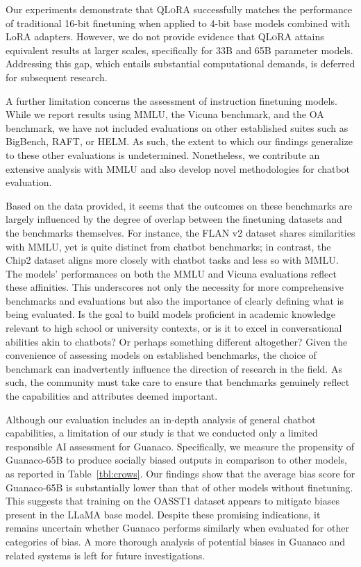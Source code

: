 Our experiments demonstrate that \textsc{QLoRA} successfully matches the performance of traditional 16-bit finetuning when applied to 4-bit base models combined with LoRA adapters. However, we do not provide evidence that \textsc{QLoRA} attains equivalent results at larger scales, specifically for 33B and 65B parameter models. Addressing this gap, which entails substantial computational demands, is deferred for subsequent research. 

A further limitation concerns the assessment of instruction finetuning models. While we report results using MMLU, the Vicuna benchmark, and the OA benchmark, we have not included evaluations on other established suites such as BigBench, RAFT, or HELM. As such, the extent to which our findings generalize to these other evaluations is undetermined. Nonetheless, we contribute an extensive analysis with MMLU and also develop novel methodologies for chatbot evaluation.

Based on the data provided, it seems that the outcomes on these benchmarks are largely influenced by the degree of overlap between the finetuning datasets and the benchmarks themselves. For instance, the FLAN v2 dataset shares similarities with MMLU, yet is quite distinct from chatbot benchmarks; in contrast, the Chip2 dataset aligns more closely with chatbot tasks and less so with MMLU. The models’ performances on both the MMLU and Vicuna evaluations reflect these affinities. This underscores not only the necessity for more comprehensive benchmarks and evaluations but also the importance of clearly defining what is being evaluated. Is the goal to build models proficient in academic knowledge relevant to high school or university contexts, or is it to excel in conversational abilities akin to chatbots? Or perhaps something different altogether? Given the convenience of assessing models on established benchmarks, the choice of benchmark can inadvertently influence the direction of research in the field. As such, the community must take care to ensure that benchmarks genuinely reflect the capabilities and attributes deemed important.

Although our evaluation includes an in-depth analysis of general chatbot capabilities, a limitation of our study is that we conducted only a limited responsible AI assessment for {Guanaco}. Specifically, we measure the propensity of {Guanaco}-65B to produce socially biased outputs in comparison to other models, as reported in Table~\ref{tbl:crows}. Our findings show that the average bias score for {Guanaco}-65B is substantially lower than that of other models without finetuning. This suggests that training on the OASST1 dataset appears to mitigate biases present in the LLaMA base model. Despite these promising indications, it remains uncertain whether {Guanaco} performs similarly when evaluated for other categories of bias. A more thorough analysis of potential biases in {Guanaco} and related systems is left for future investigations.

